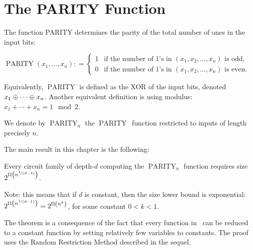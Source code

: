 \newcommand{\Parity}{\ensuremath{\operatorname{PARITY}}}


\section{The PARITY Function}

The function PARITY determines the parity of the total number of ones in the input bits:

\begin{tcolorbox}[colframe=white, colback=gray!11, boxrule=0mm, sharp corners]
$
\Parity(x_1,\dots,x_n): =
\begin{cases} 
1 & \text{if the number of 1's in } (x_1, x_2, \dots, x_n) \text{ is odd}, \\
0 & \text{if the number of 1's in } (x_1, x_2, \dots, x_n) \text{ is even}.
\end{cases}
$
\end{tcolorbox}

Equivalently, $\Parity$ is defined as the XOR of the input bits, denoted $x_1\oplus\cdots\oplus x_n$. Another equivalent definition is using modulus: $x_1+\cdots+x_n = 1 \mod 2$.

We denote by $\Parity_n$ the \Parity\ function restricted to inputs of length precisely $n$.

The main result in this chapter is the following:


\begin{tcolorbox}[colframe=white, colback=blue!11, boxrule=0mm, sharp corners]
\begin{theorem}[\ACZ\ lower bound for \Parity]
\label{thm:ACZ-lower bound}
Every circuit family of depth-$d$ computing the $\Parity_n$ function requires size $2^{\Omega\left(n^{\nicefrac{1}{(d-1)}}\right)}$.
\end{theorem}
\end{tcolorbox}



Note: this means that if $d$ is constant, then the size lower bound is exponential: $2^{\Omega\left(n^{\nicefrac{1}{(d-1)}}\right)}=
2^{\Omega\left(n^k\right)}$, for some constant $0<k<1$.

The theorem is a consequence of the fact that every function in \ACZ\ can be reduced to a constant function by setting relatively few variables to constants.
The proof uses the Random Restriction Method described in the sequel.

